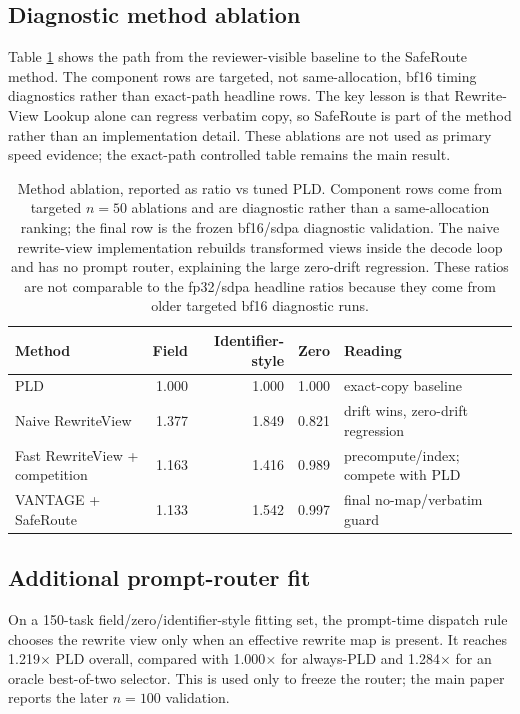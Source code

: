 \documentclass[11pt,a4paper]{article}
\begin{document}
\subsection{Diagnostic method ablation}

Table \ref{tab:method-ablation} shows the path from the reviewer-visible
baseline to the SafeRoute method. The component rows are targeted,
not same-allocation, bf16 timing diagnostics rather than exact-path headline
rows. The key lesson is that Rewrite-View Lookup alone can regress
verbatim copy, so SafeRoute is part of the method rather than an
implementation detail. These ablations are not used as primary speed evidence;
the exact-path controlled table remains the main result.

\begin{table}[h]
\centering\scriptsize
\caption{Method ablation, reported as ratio vs tuned PLD. Component rows
come from targeted $n=50$ ablations and are diagnostic rather than a
same-allocation ranking; the final row is the frozen bf16/sdpa diagnostic
validation. The naive rewrite-view implementation rebuilds transformed
views inside the decode loop and has no prompt router, explaining the
large zero-drift regression. These ratios are not comparable to the fp32/sdpa
headline ratios because they come from older targeted bf16 diagnostic runs.}
\label{tab:method-ablation}
\begin{tabular}{lrrrl}
\toprule
Method & Field & Identifier-style & Zero & Reading \\
\midrule
PLD & 1.000 & 1.000 & 1.000 & exact-copy baseline \\
Naive RewriteView & 1.377 & 1.849 & 0.821 & drift wins, zero-drift regression \\
Fast RewriteView + competition & 1.163 & 1.416 & 0.989 & precompute/index; compete with PLD \\
VANTAGE + SafeRoute & 1.133 & 1.542 & 0.997 & final no-map/verbatim guard \\
\bottomrule
\end{tabular}
\end{table}


\subsection{Additional prompt-router fit}

On a 150-task field/zero/identifier-style fitting set, the prompt-time dispatch
rule chooses the rewrite view only when an effective rewrite map is present.
It reaches 1.219$\times$ PLD overall, compared with 1.000$\times$ for
always-PLD and 1.284$\times$ for an oracle best-of-two selector. This
is used only to freeze the router; the main paper reports the later
$n=100$ validation.
\end{document}
